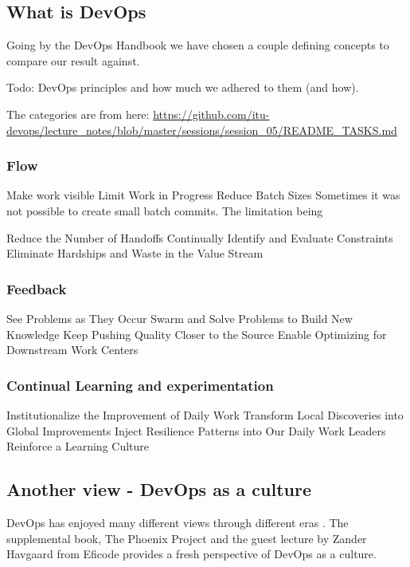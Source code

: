 \documentclass{article}
\begin{document}
{\subsection{What is DevOps}

Going by the DevOps Handbook \cite{devopshandbook} we have chosen a couple defining concepts to compare our result against. 

Todo: DevOps principles and how much we adhered to them (and how).

The categories are from here:
\url{https://github.com/itu-devops/lecture_notes/blob/master/sessions/session_05/README_TASKS.md}

\subsubsection{Flow}

Make work visible
Limit Work in Progress
Reduce Batch Sizes
Sometimes it was not possible to create small batch commits. The limitation being 

    Reduce the Number of Handoffs
    Continually Identify and Evaluate Constraints
    Eliminate Hardships and Waste in the Value Stream



\subsubsection{Feedback}

    See Problems as They Occur
    Swarm and Solve Problems to Build New Knowledge
    Keep Pushing Quality Closer to the Source
    Enable Optimizing for Downstream Work Centers


\subsubsection{Continual Learning and experimentation}

    Institutionalize the Improvement of Daily Work
    Transform Local Discoveries into Global Improvements
    Inject Resilience Patterns into Our Daily Work
    Leaders Reinforce a Learning Culture


\subsection{Another view - DevOps as a culture}

DevOps has enjoyed many different views through different eras \cite{devopsviewsthrougheras}. The supplemental book, The Phoenix Project \cite{thephoenixproject} and the guest lecture by Zander Havgaard from Eficode provides a fresh perspective of DevOps as a culture. 


}
\end{document}
